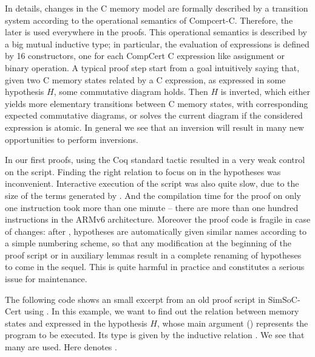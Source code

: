 In details,
changes in the C memory model are formally described
by a transition system according to the operational semantics of Compcert-C.
Therefore, the later is used everywhere in the proofs. 
This operational semantics is described by
a big mutual inductive type;
in particular, the evaluation of expressions is defined by
16 constructors, one for each CompCert C expression like assignment or binary
operation.
A typical proof step start from a goal intuitively saying that,
given two C memory states related by a C expression,
as expressed in some hypothesis $H$, 
some commutative diagram holds.
Then $H$ is inverted, which either yields more elementary 
transitions between C memory states, 
with corresponding expected commutative diagrams,
or solves the current diagram if the considered expression
is atomic. 
In general we see that an inversion will result in many
new opportunities to perform inversions.

In our first proofs, using the Coq standard \inversion tactic
resulted in a very weak control on the script.
Finding the right relation to focus on in the hypotheses
was inconvenient.
Interactive execution of the script was also quite slow,
due to the size of the terms generated by \inversion.
And the compilation time for the proof on only one instruction 
took more than one minute --
there are more than one hundred instructions in the ARMv6 architecture.
Moreover
the proof code is fragile in case of changes: 
after \inversion, hypotheses are automatically given similar names 
according to a simple numbering scheme,
so that any modification at the beginning of the proof script
or in auxiliary lemmas 
result in a complete renaming of hypotheses to come in the sequel.
This is quite harmful in practice and constitutes
a serious issue for maintenance.

The following code shows an small excerpt from 
an old proof script in SimSoC-Cert using \inversion.
In this example, we want to find out the relation between memory states
 and  expressed in the hypothesis $H$,
whose main argument ()
represents the program to be executed.
Its type is given by the inductive relation .
We see that many  are used.
Here  denotes .

